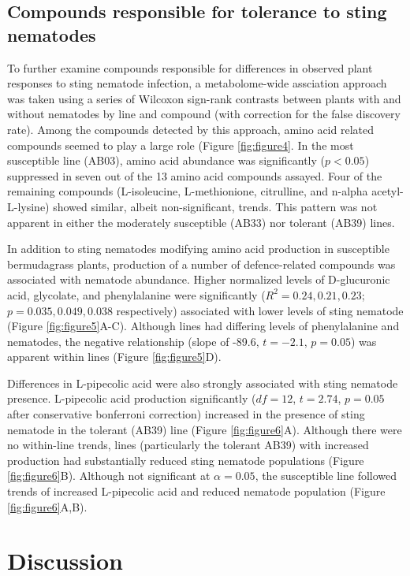 \documentclass[9pt,lineno]{elife}
\begin{document}
\subsection{Compounds responsible for tolerance to sting nematodes}
To further examine compounds responsible for differences in observed plant responses to sting nematode infection, a metabolome-wide assciation approach was taken using a series of Wilcoxon sign-rank contrasts between plants with and without nematodes by line and compound (with correction for the false discovery rate).  Among the compounds detected by this approach, amino acid related compounds seemed to play a large role (Figure \ref{fig:figure4}.  In the most susceptible line (AB03), amino acid abundance was significantly ($p < 0.05$) suppressed in seven out of the 13 amino acid compounds assayed.  Four of the remaining compounds (L-isoleucine, L-methionione, citrulline, and n-alpha acetyl-L-lysine) showed similar, albeit non-significant, trends.  This pattern was not apparent in either the moderately susceptible (AB33) nor tolerant (AB39) lines.  

In addition to sting nematodes modifying amino acid production in susceptible bermudagrass plants, production of a number of defence-related compounds was associated with nematode abundance.  Higher normalized levels of D-glucuronic acid, glycolate, and phenylalanine were significantly ($R^2 = 0.24, 0.21, 0.23$; $p = 0.035, 0.049, 0.038$ respectively) associated with lower levels of sting nematode (Figure \ref{fig:figure5}A-C).  Although lines had differing levels of phenylalanine and nematodes, the negative relationship (slope of -89.6, $t = -2.1$, $p = 0.05$) was apparent within lines (Figure \ref{fig:figure5}D).  

Differences in L-pipecolic acid were also strongly associated with sting nematode presence. L-pipecolic acid production significantly ($df = 12$, $t = 2.74$, $p = 0.05$ after conservative bonferroni correction) increased in the presence of sting nematode in the tolerant (AB39) line (Figure \ref{fig:figure6}A).  Although there were no within-line trends, lines (particularly the tolerant AB39) with increased production had substantially reduced sting nematode populations (Figure \ref{fig:figure6}B). Although not significant at $\alpha = 0.05$, the susceptible line followed trends of increased L-pipecolic acid and reduced nematode population (Figure \ref{fig:figure6}A,B).  

\section{Discussion}
\end{document}
